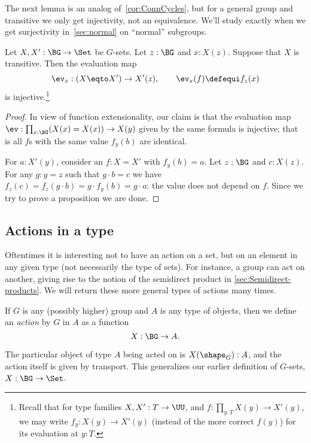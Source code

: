 The next lemma is an analog of~\cref{cor:ConnCycles},
but for a general group and transitive \covering
we only get injectivity, not an equivalence.
We'll study exactly when we get surjectivity in~\cref{sec:normal}
on ``normal'' subgroups.

\begin{lemma}
  \label{lem:evisinjwhentransitive}
  Let $X,X':\BG\to\Set$ be $G$-sets. Let $z:\BG$ and $x:X(z)$. Suppose that $X$
  is transitive. Then the evaluation map
  \[
    \ev_x:(X \eqto X')\to X'(z),\qquad \ev_x(f)\defequi f_z(x)
  \]
  is injective.\footnote{%
    Recall that for type families $X,X':T\to\UU$, and
    $f:\prod_{y:T}X(y)\to X'(y)$, we may write $f_y:X(y)\to X'(y)$ (instead of
    the more correct $f(y)$) for its evaluation at $y:T$.}
\end{lemma}
\begin{proof}
  In view of function extensionality, our claim is that the evaluation
  map $\ev:\prod_{x:\BG}(X(x)=X(x))\to X(y)$ given by the same formula
  is injective; that is all $f$s with the same value $f_y(b)$ are
  identical.

  For $a:X'(y)$, consider an $f:X=X'$ with $f_y(b)=a$. Let $z:\BG$ and
  $c:X(z)$.  For any $g:y=z$ such that $g\cdot b=c$ we have
  $f_z(c)=f_z(g\cdot b)=g \cdot f_y(b)=g \cdot a$: the value does not
  depend on $f$. Since we try to prove a proposition we are done.
\end{proof}

\subsection{Actions in a type}
\label{sec:actions}
Oftentimes it is interesting not to have an action on a set, but on an element in any given type (not necessarily the type of sets).  For instance, a group can act on another, giving rise to the notion of the semidirect product in \cref{sec:Semidirect-products}.  We will return these more general types of actions many times.

\begin{definition}\label{action}
  If $G$ is any (possibly higher) group and $A$ is any type of objects,
  then we define an \emph{action} by $G$ in %
  $A$ as a function
  \[
    X : \BG \to A.\qedhere
  \]
\end{definition}

The particular object of type $A$ being acted on is $X(\shape_G):A$,
and the action itself is given by transport.
This generalizes our earlier definition of $G$-sets, $X : \BG \to \Set$.

